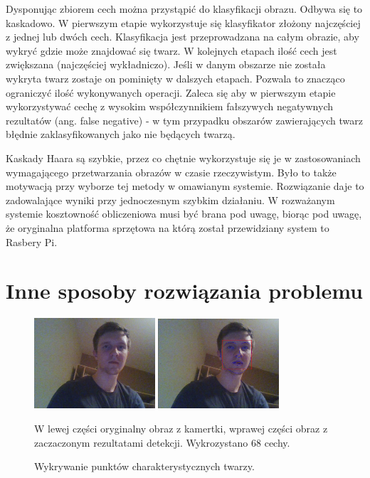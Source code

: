 \documentclass[oneside, eng]{mgr}
\begin{document}
Dysponując zbiorem cech można przystąpić do klasyfikacji obrazu. Odbywa się to kaskadowo. W pierwszym etapie wykorzystuje się klasyfikator złożony najczęściej z jednej lub dwóch cech. Klasyfikacja jest przeprowadzana na całym obrazie, aby wykryć gdzie może znajdować się twarz. W kolejnych etapach ilość cech jest zwiększana (najczęściej wykładniczo). Jeśli w danym obszarze nie została wykryta twarz zostaje on pominięty w dalszych etapach. Pozwala to znacząco ograniczyć ilość wykonywanych operacji. Zaleca się aby w pierwszym etapie wykorzystywać cechę z wysokim współczynnikiem fałszywych negatywnych rezultatów (ang. false negative) - w tym przypadku obszarów zawierających twarz błędnie zaklasyfikowanych jako nie będących twarzą.

Kaskady Haara są szybkie, przez co chętnie wykorzystuje się je w zastosowaniach wymagającego przetwarzania obrazów w czasie rzeczywistym. Było to także motywacją przy wyborze tej metody w omawianym systemie. Rozwiązanie daje to zadowalające wyniki przy jednoczesnym szybkim działaniu. W rozważanym systemie kosztowność obliczeniowa musi być brana pod uwagę, biorąc pod uwagę, że oryginalna platforma sprzętowa na którą został przewidziany system to Rasbery Pi.

\section{Inne sposoby rozwiązania problemu} \label{geometrical_features}

\begin{figure}
\centering
	\includegraphics[width=0.40\textwidth,natwidth=310,natheight=642]{test.jpg}
	\includegraphics[width=0.40\textwidth,natwidth=310,natheight=642]{test_result.jpg}
\caption{Wykrywanie punktów charakterystycznych twarzy.}
W lewej części oryginalny obraz z kamertki, wprawej części obraz z zaczaczonym rezultatami detekcji. Wykrozystano 68 cechy.
	\label{fig:face_landmark_detect}
\end{figure}
\end{document}
